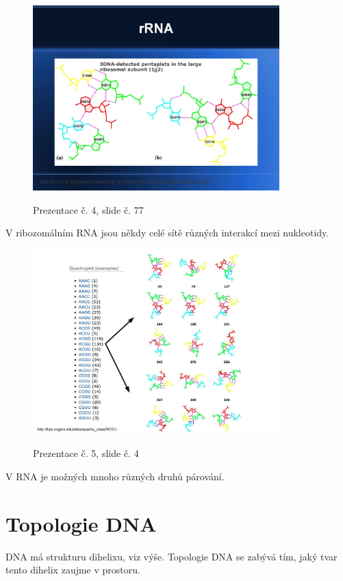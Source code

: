 \documentclass[DIV=8]{scrreprt}
\begin{document}
\begin{figure}
    \caption{Prezentace č. 4, slide č. 77}
    \includegraphics[width=0.85\textwidth]{slides-4/slide-77.jpg}
    \centering
    \label{slides-4-slide-77}
\end{figure}
 V ribozomálním RNA jsou někdy celé sítě různých interakcí mezi nukleotidy.

\begin{figure}
    \caption{Prezentace č. 5, slide č. 4}
    \includegraphics[width=0.85\textwidth]{slides-5/slide-4.jpg}
    \centering
    \label{slides-5-slide-4}
\end{figure}
 V RNA je možných mnoho různých druhů párování.

\section{Topologie DNA} \label{Topologie DNA} \FloatBarrier


DNA má strukturu dihelixu, viz výše. Topologie DNA se zabývá tím, jaký tvar tento dihelix zaujme v prostoru.
\end{document}
